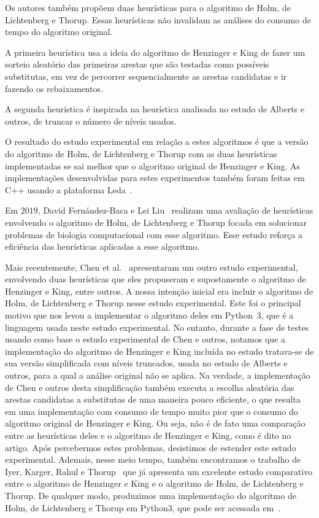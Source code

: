 Os autores também propõem duas heurísticas para o algoritmo de Holm, de Lichtenberg e Thorup. Essas heurísticas não invalidam as análises do consumo de tempo do algoritmo original.

A primeira heurística usa a ideia do algoritmo de Henzinger e King de fazer um sorteio aleatório das primeiras arestas que são testadas como possíveis substitutas, em vez de percorrer sequencialmente as arestas candidatas e ir fazendo os rebaixamentos.

A segunda heurística é inspirada na heurística analisada no estudo de Alberts e outros, de truncar o número de níveis usados.

O resultado do estudo experimental em relação a estes algoritmos é que a versão do algoritmo de Holm, de Lichtenberg e Thorup com as duas heurísticas implementadas se sai melhor que o algoritmo original de Henzinger e King.
As implementações desenvolvidas para estes experimentos também foram feitas em C++ usando a plataforma Leda~\cite{LEDA}.


Em $2019$, David Fernández-Baca e Lei Liu~\cite{xp-Phylogeny} realizam uma avaliação de heurísticas envolvendo o algoritmo de Holm, de Lichtenberg e Thorup focada em solucionar problemas de biologia computacional com esse algoritmo.
Esse estudo reforça a eficiência das heurísticas aplicadas a esse algoritmo.


Mais recentemente, Chen et al.~\cite{QC22} apresentaram um outro estudo experimental, envolvendo duas heurísticas que eles propuseram e supostamente o algoritmo de Henzinger e King, entre outros.
A nossa intenção inicial era incluir o algoritmo de Holm, de Lichtenberg e Thorup nesse estudo experimental. Este foi o principal motivo que nos levou a implementar o algoritmo deles em Python~3, que é a linguagem usada neste estudo experimental.
No entanto, durante a fase de testes usando como base o estudo experimental de Chen e outros, notamos que a implementação do algoritmo de Henzinger e King incluída no estudo tratava-se de sua versão simplificada com níveis truncados, usada no estudo de Alberts e outros, para a qual a análise original não se aplica.
Na verdade, a implementação de Chen e outros desta simplificação também executa a escolha aleatória das arestas candidatas a substitutas de uma maneira pouco eficiente, o que resulta em uma implementação com consumo de tempo muito pior que o consumo do algoritmo original de Henzinger e King.
Ou seja, não é de fato uma comparação entre as heurísticas deles e o algoritmo de Henzinger e King, como é dito no artigo.
Após percebermos estes problemas, desistimos de estender este estudo experimental.
Ademais, nesse meio tempo, também encontramos o trabalho de Iyer, Karger, Rahul e Thorup~\cite{EmpiricalStudy2002} que já apresenta um excelente estudo comparativo entre o algoritmo de Henzinger e King e o algoritmo de Holm, de Lichtenberg e Thorup. 
De qualquer modo, produzimos uma implementação do algoritmo de Holm, de Lichtenberg e Thorup em Python3, que pode ser acessada em~\cite{github}.
